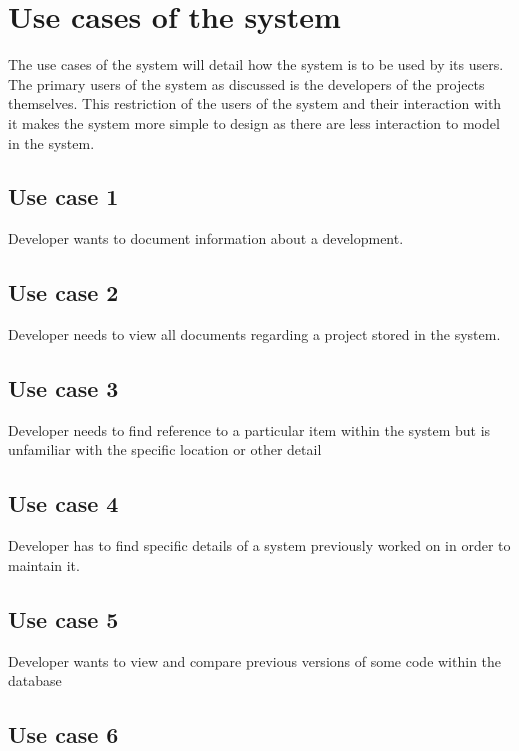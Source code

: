 \section{Use cases of the system}\label{use-cases-of-the-system}

The use cases of the system will detail how the system is to be used by
its users. The primary users of the system as discussed is the
developers of the projects themselves. This restriction of the users of
the system and their interaction with it makes the system more simple to
design as there are less interaction to model in the system.

\subsection{Use case 1}\label{use-case-1}

Developer wants to document information about a development.

\subsection{Use case 2}\label{use-case-2}

Developer needs to view all documents regarding a project stored in the
system.

\subsection{Use case 3}\label{use-case-3}

Developer needs to find reference to a particular item within the system
but is unfamiliar with the specific location or other detail

\subsection{Use case 4}\label{use-case-4}

Developer has to find specific details of a system previously worked on
in order to maintain it.

\subsection{Use case 5}\label{use-case-5}

Developer wants to view and compare previous versions of some code
within the database

\subsection{Use case 6}\label{use-case-6}

